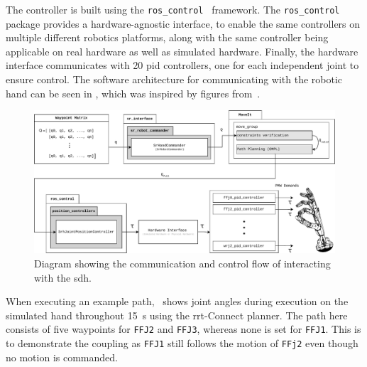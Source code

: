 The controller is built using the \texttt{ros\_control}~\cite{ros-control} framework. The \texttt{ros\_control} package provides a hardware-agnostic interface, to enable the same controllers on multiple different robotics platforms, along with the same controller being applicable on real hardware as well as simulated hardware. Finally, the hardware interface communicates with \num{20} \gls{pid} controllers, one for each independent joint to ensure control. The software architecture for communicating with the robotic hand can be seen in , which was inspired by figures from~\cite{shadow-robotics-control-description,shadow-robotics-firmware,shadow-robotics-controlling-the-hand}.
\begin{figure}[!h]
		\begin{center}
			\includegraphics[width=\textwidth]{chapters/system-setup/fig/system-communication-scheme.pdf}
		\end{center}
		\caption{Diagram showing the communication and control flow of interacting with the \gls{sdh}.}
		\label{fig:hand-communication-architecture}
\end{figure}

When executing an example path,~ shows joint angles during execution on the simulated hand throughout \SI{15}{\second} using the \gls{rrt}-Connect planner. The path here consists of five waypoints for \texttt{FFJ2} and \texttt{FFJ3}, whereas none is set for \texttt{FFJ1}. This is to demonstrate the coupling as \texttt{FFJ1} still follows the motion of \texttt{FFj2} even though no motion is commanded. \medskip

\newpage

